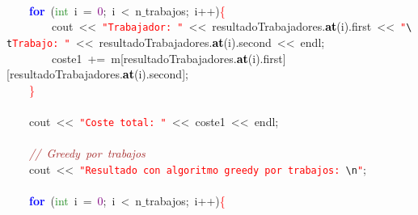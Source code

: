 \mbox{}\ \ \ \  \\
\mbox{}\ \ \ \ \textbf{\textcolor{Blue}{for}}\ \textcolor{BrickRed}{(}\textcolor{ForestGreen}{int}\ i\ \textcolor{BrickRed}{=}\ \textcolor{Purple}{0}\textcolor{BrickRed}{;}\ i\ \textcolor{BrickRed}{\textless{}}\ n$\_$trabajos\textcolor{BrickRed}{;}\ i\textcolor{BrickRed}{++)}\textcolor{Red}{\{} \\
\mbox{}\ \ \ \ \ \ \ \ cout\ \textcolor{BrickRed}{\textless{}\textless{}}\ \texttt{\textcolor{Red}{"{}Trabajador:\ "{}}}\ \textcolor{BrickRed}{\textless{}\textless{}}\ resultadoTrabajadores\textcolor{BrickRed}{.}\textbf{\textcolor{Black}{at}}\textcolor{BrickRed}{(}i\textcolor{BrickRed}{).}first\ \textcolor{BrickRed}{\textless{}\textless{}}\ \texttt{\textcolor{Red}{"{}}}\texttt{\textcolor{CarnationPink}{\textbackslash{}t}}\texttt{\textcolor{Red}{Trabajo:\ "{}}}\ \textcolor{BrickRed}{\textless{}\textless{}}\ resultadoTrabajadores\textcolor{BrickRed}{.}\textbf{\textcolor{Black}{at}}\textcolor{BrickRed}{(}i\textcolor{BrickRed}{).}second\ \textcolor{BrickRed}{\textless{}\textless{}}\ endl\textcolor{BrickRed}{;}\  \\
\mbox{}\ \ \ \ \ \ \ \ coste1\ \textcolor{BrickRed}{+=}\ m\textcolor{BrickRed}{[}resultadoTrabajadores\textcolor{BrickRed}{.}\textbf{\textcolor{Black}{at}}\textcolor{BrickRed}{(}i\textcolor{BrickRed}{).}first\textcolor{BrickRed}{][}resultadoTrabajadores\textcolor{BrickRed}{.}\textbf{\textcolor{Black}{at}}\textcolor{BrickRed}{(}i\textcolor{BrickRed}{).}second\textcolor{BrickRed}{];}\  \\
\mbox{}\ \ \ \ \textcolor{Red}{\}} \\
\mbox{} \\
\mbox{}\ \ \ \ cout\ \textcolor{BrickRed}{\textless{}\textless{}}\ \texttt{\textcolor{Red}{"{}Coste\ total:\ "{}}}\ \textcolor{BrickRed}{\textless{}\textless{}}\ coste1\ \textcolor{BrickRed}{\textless{}\textless{}}\ endl\textcolor{BrickRed}{;} \\
\mbox{} \\
\mbox{}\ \ \ \ \textit{\textcolor{Brown}{//\ Greedy\ por\ trabajos\ \ }} \\
\mbox{}\ \ \ \ cout\ \textcolor{BrickRed}{\textless{}\textless{}}\ \texttt{\textcolor{Red}{"{}Resultado\ con\ algoritmo\ greedy\ por\ trabajos:\ }}\texttt{\textcolor{CarnationPink}{\textbackslash{}n}}\texttt{\textcolor{Red}{"{}}}\textcolor{BrickRed}{;}\  \\
\mbox{} \\
\mbox{}\ \ \ \ \textbf{\textcolor{Blue}{for}}\ \textcolor{BrickRed}{(}\textcolor{ForestGreen}{int}\ i\ \textcolor{BrickRed}{=}\ \textcolor{Purple}{0}\textcolor{BrickRed}{;}\ i\ \textcolor{BrickRed}{\textless{}}\ n$\_$trabajos\textcolor{BrickRed}{;}\ i\textcolor{BrickRed}{++)}\textcolor{Red}{\{} \\
